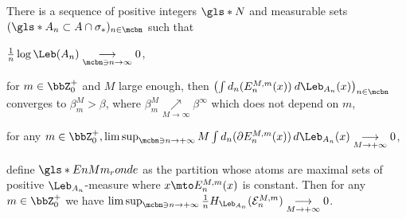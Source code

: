 \begin{lem}
\label{lem:def-An}
There is a sequence of positive integers $\gls*{N}$ and measurable sets $(\gls*{A_n} \subset A \cap \sigma_*)_{n \in \mcbn}$ such that
\begin{enumeratei}
\item\label{lem:def-Ani}
 $\frac{1}{n}\log \Leb(A_n) \underset{\mcbn \ni n \to \infty}{\longrightarrow} 0$,
\item\label{lem:def-Anii}
 for $m \in \bbZ_0^+$ and $M$ large enough, then $\left (\int d_n(E_n^{M,m}(x)) \: d \Leb_{A_n}(x) \right)_{n \in \mcbn}$ converges to $\beta_m^M > \beta$, where $\beta_m^M \underset{M \to \infty}{\nearrow} \beta^{\infty}$ which does not depend on $m$,
\item\label{lem:def-Aniii}
 for any $m \in \bbZ_0^+, \limsup_{\mcbn \ni n \to +\infty} M \int d_n(\partial E_n^{M,m}(x))\, d \Leb_{A_n}(x) \underset{M \to +\infty}{\longrightarrow} 0$,
\item\label{lem:def-Aniv}
 define
$\gls*{EnMm_ronde}$ as the partition whose atoms are maximal sets of positive $\Leb_{A_n}$-measure where $x \mto E_n^{M,m}(x)$ is constant. Then for any $m \in \bbZ_0^+$ we have
$\limsup_{\mcbn \ni n \to +\infty}\frac{1}{n} H_{\Leb_{A_n}}(\mathcal{E}_n^{M,m})\underset{M \to +\infty}{\longrightarrow} 0$.
\end{enumeratei}
\end{lem}


